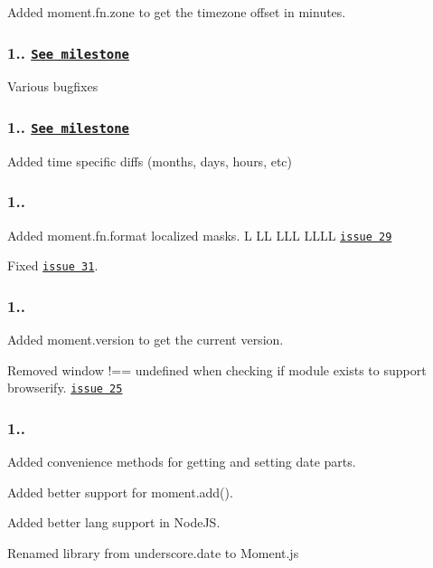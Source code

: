 Added {\ttfamily moment.\+fn.\+zone} to get the timezone offset in minutes.

\subsubsection*{1.. \href{https://github.com/timrwood/moment/issues?milestone=6&state=closed}{\tt See milestone}}

Various bugfixes

\subsubsection*{1.. \href{https://github.com/timrwood/moment/issues?milestone=5&state=closed}{\tt See milestone}}

Added time specific diffs (months, days, hours, etc)

\subsubsection*{1..}

Added {\ttfamily moment.\+fn.\+format} localized masks. \textquotesingle{}L LL L\+LL L\+L\+LL\textquotesingle{} \href{https://github.com/timrwood/moment/pull/29}{\tt issue 29}

Fixed \href{https://github.com/timrwood/moment/pull/31}{\tt issue 31}.

\subsubsection*{1..}

Added {\ttfamily moment.\+version} to get the current version.

Removed {\ttfamily window !== undefined} when checking if module exists to support browserify. \href{https://github.com/timrwood/moment/pull/25}{\tt issue 25}

\subsubsection*{1..}

Added convenience methods for getting and setting date parts.

Added better support for {\ttfamily moment.\+add()}.

Added better lang support in Node\+JS.

Renamed library from underscore.\+date to Moment.\+js

